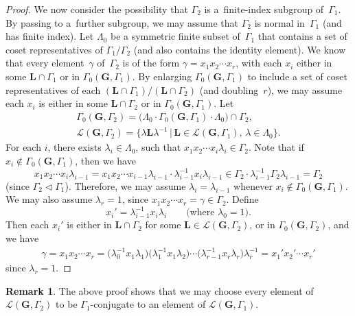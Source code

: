 \documentclass[pdftex]{sigma}
\newcommand{\Ga}{\mathbf{G}}
\newcommand{\La}{\mathbf{L}}
\newcommand{\subgroups}{\mathcal{L}}
\numberwithin{equation}{section}
\theoremstyle{definition}
\newtheorem{rem}[thm]{Remark}
\begin{document}
\begin{proof}
We now consider the possibility that $\Gamma_2$ is a~finite-index subgroup of~$\Gamma_1$. By passing to a~further subgroup, we may assume that $\Gamma_2$ is normal in~$\Gamma_1$ (and has finite index).
Let $\Lambda_0$ be a symmetric finite subset of~$\Gamma_1$ that contains a set of coset representatives of $\Gamma_1/\Gamma_2$ (and also contains the identity element). We know that every element~$\gamma$ of~$\Gamma_2$ is of the form $\gamma = x_1 x_2 \cdots x_r$, with each $x_i$ either in some $\La \cap \Gamma_1$ or in $\Gamma_0(\Ga,\Gamma_1)$. By enlarging $\Gamma_0(\Ga,\Gamma_1)$ to include a set of coset representatives of each $(\La \cap \Gamma_1)/(\La \cap \Gamma_2)$ (and doubling~$r$), we may assume each $x_i$ is either in some $\La \cap \Gamma_2$ or in $\Gamma_0(\Ga,\Gamma_1)$.
Let
\begin{gather*}
\Gamma_0(\Ga,\Gamma_2) = \bigl( \Lambda_0 \cdot \Gamma_0(\Ga,\Gamma_1) \cdot \Lambda_0 \bigr) \cap \Gamma_2,\\
\subgroups(\Ga,\Gamma_2) = \big\{ \lambda \La \lambda^{-1} \,|\, \La \in \subgroups(\Ga,\Gamma_1), \, \lambda \in \Lambda_0 \big\} .
\end{gather*}
For each $i$, there exists $\lambda_i \in \Lambda_0$, such that $x_1 x_2 \cdots x_i \lambda_i \in \Gamma_2$. Note that if $x_i \notin \Gamma_0(\Ga,\Gamma_1)$, then we have
	\[ x_1 x_2 \cdots x_i \lambda_{i-1}
	= x_1 x_2 \cdots x_{i-1} \lambda_{i-1} \cdot \lambda_{i-1}^{-1} x_i \lambda_{i-1}
	\in \Gamma_2 \cdot \lambda_{i-1}^{-1} \Gamma_2 \lambda_{i-1}
	= \Gamma_2
	\]
(since $\Gamma_2 \triangleleft \Gamma_1$). Therefore, we may assume $\lambda_i = \lambda_{i-1}$ whenever $x_i \notin \Gamma_0(\Ga,\Gamma_1)$. We may also assume $\lambda_r = 1$, since $x_1 x_2 \cdots x_r = \gamma \in \Gamma_2$.
Define
	\[ x_i' = \lambda_{i-1}^{-1} x_i \lambda_i
	\qquad \text{(where $\lambda_0 = 1$)} .\]
Then each $x_i'$ is either in $\La \cap \Gamma_2$ for some $\La \in \subgroups(\Ga,\Gamma_2)$, or in $\Gamma_0(\Ga,\Gamma_2)$,
	and we have
		\begin{gather*}
		\gamma
		 = x_1 x_2 \cdots x_r
		= \big(\lambda_0^{-1} x_1 \lambda_1\big) \big(\lambda_1^{-1} x_1 \lambda_2\big)
		\cdots \big(\lambda_{r-1}^{-1} x_r \lambda_r\big) \lambda_r^{-1}
		= x_1' x_2' \cdots x_r'
		 \end{gather*}
since $\lambda_r = 1$.
\end{proof}

\begin{rem}The above proof shows that we may choose every element of $\subgroups(\Ga,\Gamma_2)$ to be $\Gamma_1$-conjugate to an element of $\subgroups(\Ga,\Gamma_1)$.
\end{rem}
\end{document}
